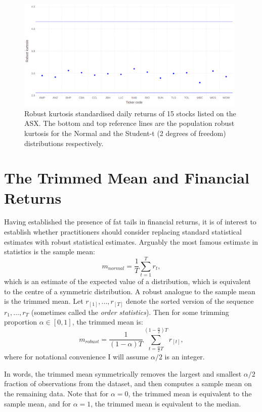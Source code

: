 \documentclass[12pt,a4paper]{amsart}
\renewcommand{\a}{\alpha}
\begin{document}
\begin{figure}[htbp]
\centering
\includegraphics[height=5.35cm]{RobustKurtStocksStd.png}
\caption{\footnotesize{Robust kurtosis standardised daily returns of 15 stocks listed on the ASX. The bottom and top reference lines are the population robust kurtosis for the Normal and the Student-t (2 degrees of freedom) distributions respectively.}}
\label{figRobustKurtStocksStd}
\end{figure}



\section{The Trimmed Mean and Financial Returns}\label{secFinReturnTailFatness}

Having established the presence of fat tails in financial returns, it is of interest to establish whether practitioners should consider replacing standard statistical estimates with robust statistical estimates. Arguably the most famous estimate in statistics is the sample mean:
\begin{equation}
m_{normal} = \frac{1}{T} \sum_{t=1}^T r_t ,
\end{equation}
which is an estimate of the expected value of a distribution, which is equivalent to the centre of a symmetric distribution. A robust analogue to the sample mean is the trimmed mean. Let $r_{[1]}, ..., r_{[T]}$ denote the sorted version of the sequence $r_1, ..., r_T$ (sometimes called the \emph{order statistics}). Then for some trimming proportion $\a \in [0, 1]$, the trimmed mean is:
\begin{equation}
m_{robust} = \frac{1}{(1 - \a) T} \sum_{t=\frac{\a}{2} T}^{(1 - \frac{\a}{2}) T} r_{[t]} ,
\end{equation}
where for notational convenience I will assume $\a / 2$ is an integer.

In words, the trimmed mean symmetrically removes the largest and smallest $\a / 2$ fraction of observations from the dataset, and then computes a sample mean on the remaining data. Note that for $\a = 0$, the trimmed mean is equivalent to the sample mean, and for $\a = 1$, the trimmed mean is equivalent to the median.
\end{document}
